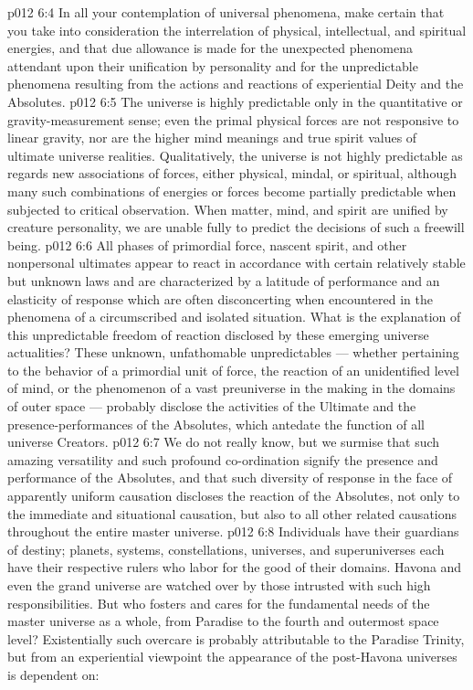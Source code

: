 \vs p012 6:4 In all your contemplation of universal phenomena, make certain that you take into consideration the interrelation of physical, intellectual, and spiritual energies, and that due allowance is made for the unexpected phenomena attendant upon their unification by personality and for the unpredictable phenomena resulting from the actions and reactions of experiential Deity and the Absolutes.
\vs p012 6:5 The universe is highly predictable only in the quantitative or gravity\hyp{}measurement sense; even the primal physical forces are not responsive to linear gravity, nor are the higher mind meanings and true spirit values of ultimate universe realities. Qualitatively, the universe is not highly predictable as regards new associations of forces, either physical, mindal, or spiritual, although many such combinations of energies or forces become partially predictable when subjected to critical observation. When matter, mind, and spirit are unified by creature personality, we are unable fully to predict the decisions of such a freewill being.
\vs p012 6:6 \pc All phases of primordial force, nascent spirit, and other nonpersonal ultimates appear to react in accordance with certain relatively stable but unknown laws and are characterized by a latitude of performance and an elasticity of response which are often disconcerting when encountered in the phenomena of a circumscribed and isolated situation. What is the explanation of this unpredictable freedom of reaction disclosed by these emerging universe actualities? These unknown, unfathomable unpredictables --- whether pertaining to the behavior of a primordial unit of force, the reaction of an unidentified level of mind, or the phenomenon of a vast preuniverse in the making in the domains of outer space --- probably disclose the activities of the Ultimate and the presence\hyp{}performances of the Absolutes, which antedate the function of all universe Creators.
\vs p012 6:7 We do not really know, but we surmise that such amazing versatility and such profound co\hyp{}ordination signify the presence and performance of the Absolutes, and that such diversity of response in the face of apparently uniform causation discloses the reaction of the Absolutes, not only to the immediate and situational causation, but also to all other related causations throughout the entire master universe.
\vs p012 6:8 \pc Individuals have their guardians of destiny; planets, systems, constellations, universes, and superuniverses each have their respective rulers who labor for the good of their domains. Havona and even the grand universe are watched over by those intrusted with such high responsibilities. But who fosters and cares for the fundamental needs of the master universe as a whole, from Paradise to the fourth and outermost space level? Existentially such overcare is probably attributable to the Paradise Trinity, but from an experiential viewpoint the appearance of the post\hyp{}Havona universes is dependent on:
